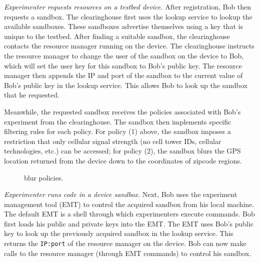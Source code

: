\emph{Experimenter requests resources on a testbed device.} 
After registration, Bob then requests a sandbox. The clearinghouse first 
uses the lookup service to lookup the available sandboxes. These 
sandboxes advertise themselves using a key that is unique to the testbed. 
After finding a suitable sandbox,
the clearinghouse contacts the resource manager running on the device. 
The clearinghouse instructs the resource manager to
change the user of the sandbox on the device to Bob, which will set 
the user key for this sandbox to Bob's public key. The resource manager then 
appends the IP and port of the sandbox to the current value of Bob's
public key in the lookup service. This allows Bob to look up
the sandbox that he requested.

Meanwhile, the requested sandbox receives the policies associated with 
Bob's experiment from the clearinghouse. The sandbox then implements specific 
filtering rules for each policy. For policy (1) above, the sandbox 
imposes a restriction that only cellular signal strength (no cell tower 
IDs, cellular technologies, etc.) can be accessed; for policy (2), 
the sandbox blurs the GPS location returned from the device 
down to the coordinates of zipcode regions. 

\begin{figure}
\caption{\small \sysname blur policies. 
\label{fig-blur}}
\end{figure}


\emph{Experimenter runs code in a device sandbox.} Next, Bob uses the
experiment management tool (EMT) to control the acquired sandbox from
his local machine. The default EMT is a shell through which
experimenters execute commands.
%
Bob first loads his public and private keys into the EMT. The EMT uses Bob's
public key to look up the previously acquired sandbox in the lookup
service. This returns the
\texttt{IP:port} of the resource manager on the device. %
Bob can now make calls to the resource manager (through EMT
commands) to control his sandbox. 

